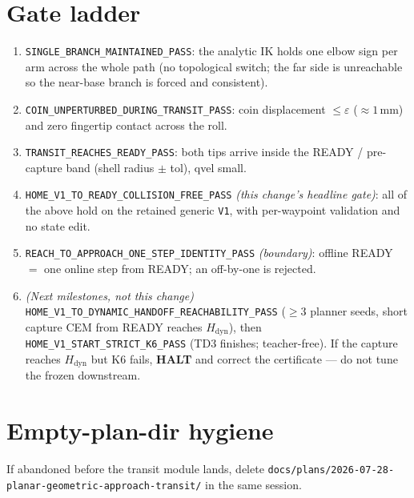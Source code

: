 \documentclass[11pt]{article}
\newcommand{\code}[1]{\texttt{\small #1}}
\newcommand{\halt}{\textcolor{red!70!black}{\textbf{HALT}}}
\begin{document}
\section{Gate ladder}
\begin{enumerate}[nosep,leftmargin=1.6em]
  \item \code{SINGLE\_BRANCH\_MAINTAINED\_PASS}: the analytic IK holds one elbow sign per arm across the whole path
  (no topological switch; the far side is unreachable so the near-base branch is forced and consistent).
  \item \code{COIN\_UNPERTURBED\_DURING\_TRANSIT\_PASS}: coin displacement $\le\varepsilon$ ($\approx1$\,mm) and zero
  fingertip contact across the roll.
  \item \code{TRANSIT\_REACHES\_READY\_PASS}: both tips arrive inside the READY / pre-capture band (shell radius
  $\pm$ tol), qvel small.
  \item \code{HOME\_V1\_TO\_READY\_COLLISION\_FREE\_PASS} \emph{(this change's headline gate)}: all of the above hold on
  the retained generic \code{V1}, with per-waypoint validation and no state edit.
  \item \code{REACH\_TO\_APPROACH\_ONE\_STEP\_IDENTITY\_PASS} \emph{(boundary)}: offline READY $=$ one online step from
  READY; an off-by-one is rejected.
  \item \emph{(Next milestones, not this change)} \code{HOME\_V1\_TO\_DYNAMIC\_HANDOFF\_REACHABILITY\_PASS} ($\ge3$
  planner seeds, short capture CEM from READY reaches $H_{\text{dyn}}$), then \code{HOME\_V1\_START\_STRICT\_K6\_PASS}
  (TD3 finishes; teacher-free). If the capture reaches $H_{\text{dyn}}$ but K6 fails, \halt{} and correct the certificate
  --- do not tune the frozen downstream.
\end{enumerate}

\section{Empty-plan-dir hygiene}
If abandoned before the transit module lands, delete
\code{docs/plans/2026-07-28-planar-geometric-approach-transit/} in the same session.
\end{document}
